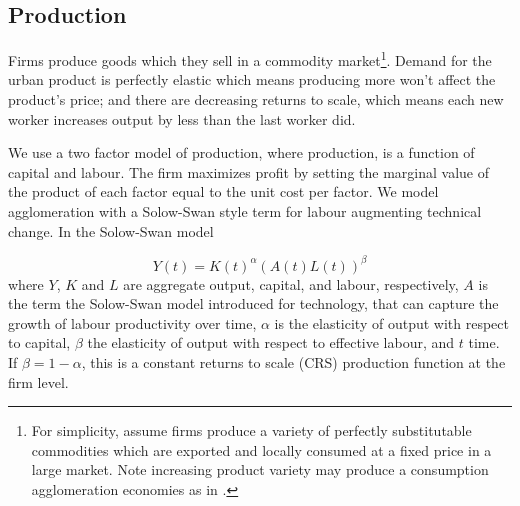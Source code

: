 







\subsection{Production}

Firms produce goods which they sell in a commodity market\footnote{For simplicity, assume firms produce a variety of perfectly substitutable commodities which are exported and locally consumed at a fixed price in a large market. Note increasing product variety may produce a consumption agglomeration economies as in \cite{FujitaKrugmanVenables}.}. Demand for the urban product is perfectly elastic which means producing more won't affect the product's price; and there are decreasing returns to scale, which means each new worker increases output by less than the last worker did. 
  
We use a two factor model of production, where production, is a function of capital and labour. The firm maximizes profit by setting the marginal value of the product of each factor equal to the unit cost per factor. We model agglomeration with a Solow-Swan style term for labour augmenting technical change. In the Solow-Swan model 

 \begin{equation} 
Y(t)=K(t)^{\alpha }(A(t)L(t))^{\beta }
\label{Eqn:Solow-Swann}
 \end{equation}
where $Y$, $K$ and $L$ are aggregate output, capital, and labour, respectively,  $A$ is the term the Solow-Swan model introduced for technology, that can capture the growth of labour productivity over time, $\alpha$ is the elasticity of output with respect to capital, $\beta$ the elasticity of output with respect to effective labour, and $t$ time. If $\beta=1-\alpha$, this is a constant returns to scale (CRS) production function at the firm level.

 
